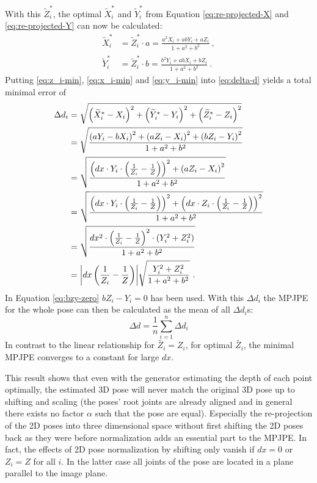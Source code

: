 With this $\widetilde{Z}_i^\ast$, the optimal $\widetilde{X}_i^\ast$ and $\widetilde{Y}_i^\ast$ from Equation \eqref{eq:re-projected-X} and \eqref{eq:re-projected-Y} can now be calculated:
\begin{align}
	\label{eq:x_i-min}
	\widetilde{X}_i^\ast &= \widetilde{Z}_i^\ast \cdot a
	= \frac{a^2 X_i + a b Y_i +  a Z_i}{1 + a^2 + b^2} \ ,\\
	\label{eq:y_i-min}
	\widetilde{Y}_i^\ast &= \widetilde{Z}_i^\ast \cdot b
	= \frac{b^2 Y_i + a b X_i + b Z_i}{1 + a^2 + b^2} \ . 
\end{align}
Putting \eqref{eq:z_i-min}, \eqref{eq:x_i-min} and \eqref{eq:y_i-min} into \eqref{eq:delta-d} yields a total minimal error of 
\begin{align}
	\Delta d_i &= 
	\sqrt{\left (\widetilde{X}_i^\ast - X_i \right )^2 + \left (\widetilde{Y}_i^\ast - Y_i \right )^2 + \left (\widetilde{Z}_i^\ast - Z_i \right )^2}\\
	& = \sqrt{\frac{\left (a Y_i - b X_i \right )^2 + \left (a Z_i - X_i \right )^2 + \left (b Z_i - Y_i \right )^2}{1 + a^2 + b^2}} \\
	\label{eq:bzy-zero}
	&= \sqrt{\frac{\left (dx \cdot Y_i \cdot \left (\frac{1}{Z_i} - \frac{1}{Z} \right) \right)^2 + \left (a Z_i - X_i \right )^2}{1 + a^2 + b^2}}\\
	& = \sqrt{\frac{\left (dx \cdot Y_i \cdot \left (\frac{1}{Z_i} - \frac{1}{Z} \right ) \right)^2 + \left (dx \cdot Z_i \cdot \left (\frac{1}{Z_i} - \frac{1}{Z} \right ) \right)^2}{1 + a^2 + b^2}} \\
	& = \sqrt{\frac{dx^2 \cdot \left (\frac{1}{Z_i} - \frac{1}{Z} \right )^2 \cdot \left (Y_i^2 + Z_i^2 \right ) }{1 + a^2 + b^2}}\\
	\label{eq:minimum-delta-d}
	& = \abs{dx \left (\frac{1}{Z_i} - \frac{1}{Z} \right )} \sqrt{\frac{Y_i^2 + Z_i^2}{1 + a^2 + b^2}} \ .
\end{align}
In Equation \eqref{eq:bzy-zero} $b Z_i - Y_i = 0$ has been used.
With this $\Delta d_i$ the MPJPE for the whole pose can then be calculated as the mean of all $\Delta d_i$s:
\begin{equation}
	\label{eq:minimum-mpjpe-on-shift}
	\Delta d = \frac{1}{n} \sum_{i = 1}^{n} \Delta d_i 
\end{equation}
In contrast to the linear relationship for $\widetilde{Z_i} = Z_i$, for optimal $\widetilde{Z_i}$, the minimal MPJPE converges to a constant for large $dx$.

This result shows that even with the generator estimating the depth of each point optimally, the estimated 3D pose will never match the original 3D pose up to shifting and scaling (the poses' root joints are already aligned and in general there exists no factor $\alpha$ such that the pose are equal).
Especially the re-projection of the 2D poses into three dimensional space without first shifting the 2D poses back as they were before normalization adds an essential part to the MPJPE.
In fact, the effects of 2D pose normalization by shifting only vanish if $dx = 0$ or $Z_i = Z$ for all $i$. 
In the latter case all joints of the pose are located in a plane parallel to the image plane.

